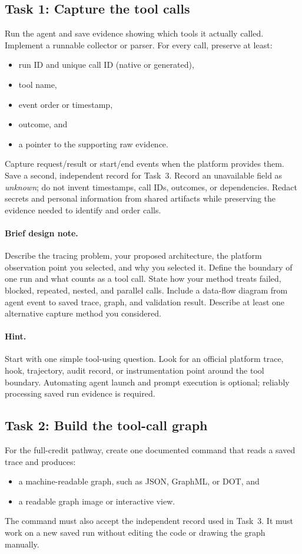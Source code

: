 \documentclass[11pt]{article}
\begin{document}
\subsection{Task 1: Capture the tool calls}
Run the agent and save evidence showing which tools it actually called. Implement a runnable collector or parser. For every call, preserve at least:
\begin{itemize}
  \item run ID and unique call ID (native or generated),
  \item tool name,
  \item event order or timestamp,
  \item outcome, and
  \item a pointer to the supporting raw evidence.
\end{itemize}
Capture request/result or start/end events when the platform provides them. Save a second, independent record for Task~3. Record an unavailable field as \emph{unknown}; do not invent timestamps, call IDs, outcomes, or dependencies. Redact secrets and personal information from shared artifacts while preserving the evidence needed to identify and order calls.

\paragraph{Brief design note.}
Describe the tracing problem, your proposed architecture, the platform observation point you selected, and why you selected it. Define the boundary of one run and what counts as a tool call. State how your method treats failed, blocked, repeated, nested, and parallel calls. Include a data-flow diagram from agent event to saved trace, graph, and validation result. Describe at least one alternative capture method you considered.

\paragraph{Hint.}
Start with one simple tool-using question. Look for an official platform trace, hook, trajectory, audit record, or instrumentation point around the tool boundary. Automating agent launch and prompt execution is optional; reliably processing saved run evidence is required.

\subsection{Task 2: Build the tool-call graph}
For the full-credit pathway, create one documented command that reads a saved trace and produces:
\begin{itemize}
  \item a machine-readable graph, such as JSON, GraphML, or DOT, and
  \item a readable graph image or interactive view.
\end{itemize}
The command must also accept the independent record used in Task~3. It must work on a new saved run without editing the code or drawing the graph manually.
\end{document}

